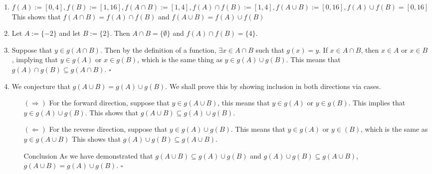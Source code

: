 \documentclass[12 pt]{article}
\newcommand{\qed}[0]{$\square$}
\begin{document}
\begin{enumerate}
    \item \(f(A) := [0, 4], f(B) := [1, 16], f(A \cap B) := [1, 4], f(A) \cap f(B) := [1, 4], f(A\cup B) := [0, 16], f(A) \cup f(B) = [0, 16]\)
    \\
    This shows that \(f(A \cap B) = f(A) \cap f(B)\) and \(f(A \cup B) = f(A) \cup f(B)\)

    \item Let \(A := \{-2\}\) and let \(B := \{2\}\). Then \(A \cap B = \{\emptyset\}\) and \(f(A) \cap f(B) = \{4\}\).
    \item Suppose that \(y \in g(A \cap B)\). Then by the definition of a function, \(\exists x \in A \cap B\) such that \(g(x) = y\). If \(x \in A \cap B\), then \(x \in A\) or \(x \in B\), implying that \(y \in g(A)\) or \(x \in g(B)\), which is the same thing as \(y \in g(A) \cup g(B)\). This means that \(g(A) \cap g(B) \subseteq g(A \cap B)\). \qed 
    \item We conjecture that \(g(A \cup B) = g(A) \cup g(B)\). We shall prove this by showing inclusion in both directions via cases.
    \begin{enumerate}
        \item[\((\Rightarrow)\)] For the forward direction, suppose that \(y \in g(A \cup B)\), this means that \(y \in g(A)\) or \(y \in g(B)\). This implies that \(y \in g(A) \cup g(B)\). This shows that \(g(A \cup B) \subseteq g(A) \cup g(B)\).
        \item[\((\Leftarrow)\)] For the reverse direction, suppose that \(y \in g(A) \cup g(B)\). This means that \(y \in g(A)\) or \(y \in (B)\), which is the same as \(y \in g(A \cup B)\) This shows that \(g(A) \cup g(B) \subseteq g(A \cup B)\).
        \item[Conclusion] As we have demonstrated that \(g(A \cup B) \subseteq g(A) \cup g(B)\) and \(g(A) \cup g(B) \subseteq g(A \cup B)\), \(g(A \cup B) = g(A) \cup g(B)\). \qed
    \end{enumerate}
\end{enumerate}
\end{document}
